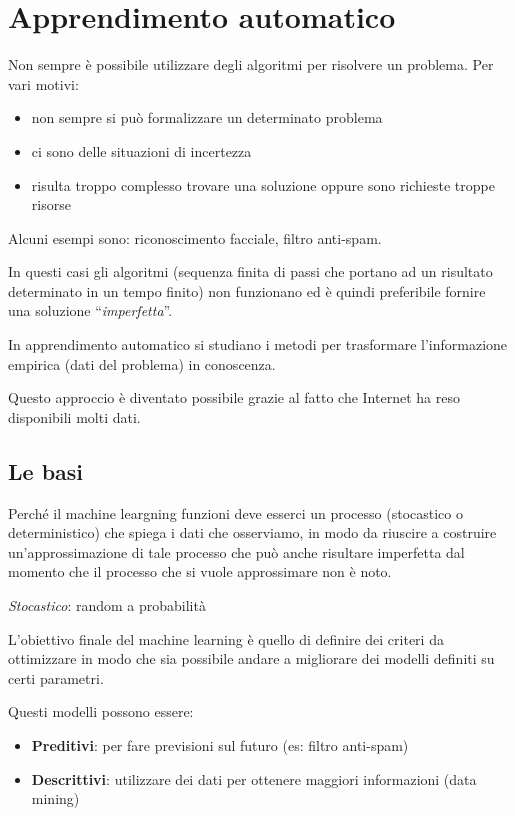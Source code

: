\section{Apprendimento automatico}\label{apprendimento-automatico}

Non sempre è possibile utilizzare degli algoritmi per risolvere un problema.
Per vari motivi:

\begin{itemize}
\item non sempre si può formalizzare un determinato problema
\item ci sono delle situazioni di incertezza
\item risulta troppo complesso trovare una soluzione oppure sono richieste troppe risorse
\end{itemize}

Alcuni esempi sono: riconoscimento facciale, filtro anti-spam.

In questi casi gli algoritmi (sequenza finita di passi che portano ad un risultato determinato in un tempo finito) non funzionano ed è quindi preferibile fornire una soluzione ``\emph{imperfetta}''.

In apprendimento automatico si studiano i metodi per trasformare l'informazione empirica (dati del problema) in conoscenza.

Questo approccio è diventato possibile grazie al fatto che Internet ha reso disponibili molti dati.

\subsection{Le basi}\label{le-basi}

Perché il machine leargning funzioni deve esserci un processo
(stocastico o deterministico) che spiega i dati che osserviamo, in modo
da riuscire a costruire un'approssimazione di tale processo che può
anche risultare imperfetta dal momento che il processo che si vuole
approssimare non è noto.

\emph{Stocastico}: random a probabilità

L'obiettivo finale del machine learning è quello di definire dei criteri
da ottimizzare in modo che sia possibile andare a migliorare dei modelli
definiti su certi parametri.

Questi modelli possono essere:

\begin{itemize}
\item
  \textbf{Preditivi}: per fare previsioni sul futuro (es: filtro
  anti-spam)
\item
  \textbf{Descrittivi}: utilizzare dei dati per ottenere maggiori
  informazioni (data mining)
\end{itemize}

